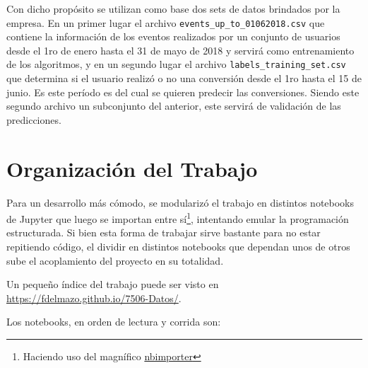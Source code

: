 \documentclass[a4paper]{article}
\begin{document}
Con dicho propósito se utilizan como base dos sets de datos brindados por la empresa. En un primer lugar el archivo \texttt{events\_up\_to\_01062018.csv} que contiene la información de los eventos realizados por un conjunto de usuarios desde el 1ro de enero hasta el 31 de mayo de 2018 y servirá como entrenamiento de los algoritmos, y en un segundo lugar el archivo \texttt{labels\_training\_set.csv} que determina si el usuario realizó o no una conversión desde el 1ro hasta el 15 de junio. Es este período es del cual se quieren predecir las conversiones. Siendo este segundo archivo un subconjunto del anterior, este servirá de validación de las predicciones.

\section{Organización del Trabajo}

Para un desarrollo más cómodo, se modularizó el trabajo en distintos notebooks de Jupyter que luego se importan entre sí\footnote{Haciendo uso del magnífico \href{https://github.com/grst/nbimporter}{nbimporter}}, intentando emular la programación estructurada. Si bien esta forma de trabajar sirve bastante para no estar repitiendo código, el dividir en distintos notebooks que dependan unos de otros sube el acoplamiento del proyecto en su totalidad.

Un pequeño índice del trabajo puede ser visto en \url{https://fdelmazo.github.io/7506-Datos/}.

Los notebooks, en orden de lectura y corrida son:
\end{document}
